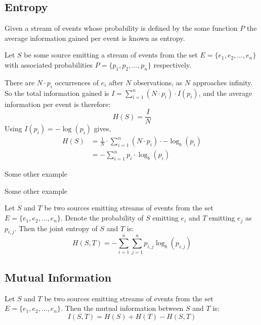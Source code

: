 \subsection{Entropy}
Given a stream of events whose probability is defined by the some function $P$ the average information gained per event is known as entropy.
%
\begin{mydef}
Let $S$ be some source emitting a stream of events from the set $E = \{e_1, e_2, \ldots, e_n\}$ with associated probabilities $P = \{p_1, p_2, \ldots, p_n\}$ respectively.

There are $N\cdot p_i$ occurrences of $e_i$ after $N$ observations, as $N$ approaches infinity.  So the total information gained is $I = \sum_{i = 1}^n (N \cdot p_i) \cdot I(p_i)$, and the average information per event is therefore:
\[ H(S) = \frac{I}{N} \]
Using $I(p_i) = -\log(p_i)$ gives,
\begin{align*}
H(S) &= \frac{1}{N} \cdot \sum_{i = 1}^n  (N \cdot p_i) \cdot -\log_b (p_i)\\
	 &= -\sum_{i = 1}^n  p_i \cdot \log_b (p_i)
\end{align*}  
\end{mydef}

\begin{myexample}
Some other example
\end{myexample}
\begin{myexample}
Some other example
\end{myexample}

\begin{mydef}
Let $S$ and $T$ be two sources emitting streams of events from the set $E = \{e_1, e_2, \ldots, e_n\}$.  Denote the probability of $S$ emitting $e_i$ and $T$ emitting $e_j$ as $p_{i,j}$.  Then the joint entropy of $S$ and $T$ is:
\[H(S, T) = -\sum_{i = 1}^n\sum_{j = 1}^n p_{i,j} \log_b (p_{i,j})\]
\end{mydef}

\subsection{Mutual Information}
\begin{mydef}
Let $S$ and $T$ be two sources emitting streams of events from the set $E = \{e_1, e_2, \ldots, e_n\}$. Then the mutual information between $S$ and $T$ is:
\[I(S,T) = H(S) + H(T) - H(S,T)\]
\end{mydef}

